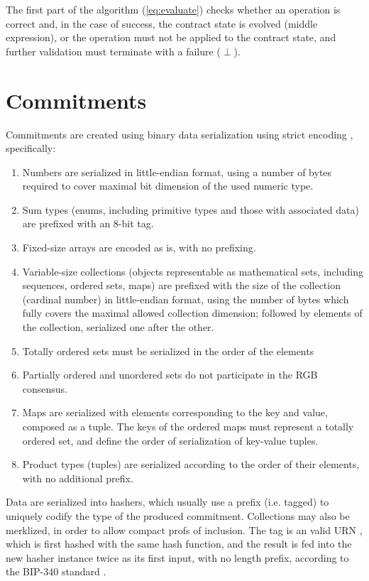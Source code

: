 \documentclass[9pt,oneside]{amsart}
\begin{document}
\begin{multicols}{2}
The first part of the algorithm (\ref{eq:evaluate}) checks whether an operation is correct and,
in the case of success, the contract state is evolved (middle expression),
or the operation must not be applied to the contract state,
and further validation must terminate with a failure ($\perp$).

\section{Commitments}\label{Commitments}

Commitments are created using binary data serialization using strict encoding \cite{strict},
specifically:
\begin{enumerate}
\item Numbers are serialized in little-endian format,
   using a number of bytes required to cover maximal bit dimension of the used numeric type.
\item Sum types (enums, including primitive types and those with associated data)
   are prefixed with an 8-bit tag.
\item Fixed-size arrays are encoded as is, with no prefixing.
\item Variable-size collections (objects representable as mathematical sets,
   including sequences, ordered sets, maps)
   are prefixed with the size of the collection (cardinal number) in little-endian format,
   using the number of bytes which fully covers the maximal allowed collection dimension;
   followed by elements of the collection, serialized one after the other.
\item Totally ordered sets must be serialized in the order of the elements
\item Partially ordered and unordered sets do not participate in the RGB consensus.
\item Maps are serialized with elements corresponding to the key and value, composed as a tuple.
   The keys of the ordered maps must represent a totally ordered set,
   and define the order of serialization of key-value tuples.
\item Product types (tuples) are serialized according to the order of their elements,
   with no additional prefix.
\end{enumerate}

Data are serialized into hashers, which usually use a prefix (i.e. tagged)
to uniquely codify the type of the produced commitment.
Collections may also be merklized, in order to allow compact profs of inclusion.
The tag is an valid URN \cite{URN}, which is first hashed with the same hash function,
and the result is fed into the new hasher instance twice as its first input,
with no length prefix, according to the BIP-340 standard \cite{BIP341}.


\end{multicols}
\end{document}
